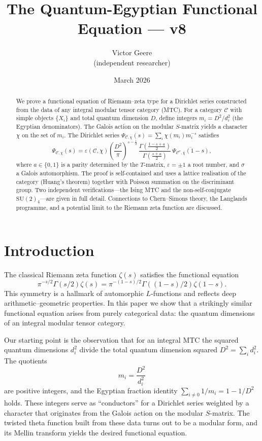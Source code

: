 \documentclass[12pt,a4paper]{article}
\title{The Quantum-Egyptian Functional Equation --- v8}
\author{Victor Geere\\(independent researcher)}
\date{March 2026}
\theoremstyle{definition}
\theoremstyle{remark}
\begin{document}
\maketitle

\begin{abstract}
We prove a functional equation of Riemann--zeta type for a Dirichlet series
constructed from the data of any integral modular tensor category (MTC). For a
category $\mathcal{C}$ with simple objects $\{X_i\}$ and total quantum dimension
$D$, define integers $m_i = D^2 / d_i^2$ (the Egyptian denominators). The Galois
action on the modular $S$-matrix yields a character $\chi$ on the set of $m_i$.
The Dirichlet series $\Psi_{\mathcal{C},\chi}(s) = \sum_i \chi(m_i) m_i^{-s}$
satisfies
\[
\Psi_{\mathcal{C},\chi}(s) = \varepsilon(\mathcal{C},\chi)\left(\frac{D^2}{\pi}\right)^{s-\frac12}\,
\frac{\Gamma\!\left(\frac{1-s+a}{2}\right)}{\Gamma\!\left(\frac{s+a}{2}\right)}\,
\overline{\Psi_{\mathcal{C}^{\sigma},\overline{\chi}}(1-s)},
\]
where $a\in\{0,1\}$ is a parity determined by the $T$-matrix,
$\varepsilon=\pm1$ a root number, and $\sigma$ a Galois automorphism. The proof
is self-contained and uses a lattice realisation of the category (Huang's theorem)
together with Poisson summation on the discriminant group. Two independent
verifications---the Ising MTC and the non-self-conjugate
$\mathrm{SU}(2)_4$---are given in full detail. Connections to Chern--Simons
theory, the Langlands programme, and a potential limit to the Riemann zeta function
are discussed.
\end{abstract}

\tableofcontents


\section{Introduction}

The classical Riemann zeta function $\zeta(s)$ satisfies the functional equation
\[
\pi^{-s/2}\Gamma(s/2)\zeta(s) = \pi^{-(1-s)/2}\Gamma((1-s)/2)\zeta(1-s).
\]
This symmetry is a hallmark of automorphic $L$-functions and reflects deep
arithmetic--geometric properties. In this paper we show that a strikingly similar
functional equation arises from purely categorical data: the quantum dimensions of
an integral modular tensor category.

Our starting point is the observation that for an integral MTC the squared quantum
dimensions $d_i^2$ divide the total quantum dimension squared
$D^2 = \sum_i d_i^2$. The quotients
\[
m_i = \frac{D^2}{d_i^2}
\]
are positive integers, and the Egyptian fraction identity
$\sum_{i\neq0}1/m_i = 1 - 1/D^2$ holds. These integers serve as ``conductors''
for a Dirichlet series weighted by a character that originates from the Galois
action on the modular $S$-matrix. The twisted theta function built from these data
turns out to be a modular form, and its Mellin transform yields the desired
functional equation.
\end{document}
